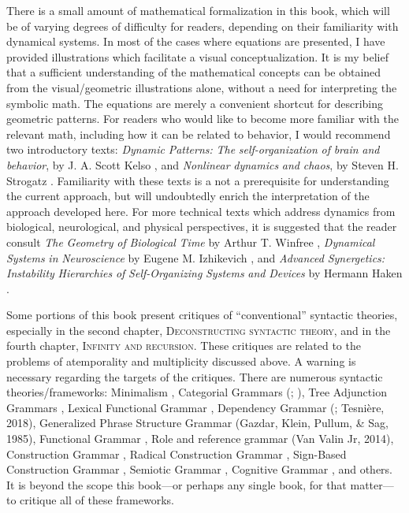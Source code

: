   There is a small amount of mathematical formalization in this book, which will be of varying degrees of difficulty for readers, depending on their familiarity with dynamical systems. In most of the cases where equations are presented, I have provided illustrations which facilitate a visual conceptualization. It is my belief that a sufficient understanding of the mathematical concepts can be obtained from the visual/geometric illustrations alone, without a need for interpreting the symbolic math. The equations are merely a convenient shortcut for describing geometric patterns. For readers who would like to become more familiar with the relevant math, including how it can be related to behavior, I would recommend two introductory texts: \textit{Dynamic} \textit{Patterns:} \textit{The} \textit{self-organization} \textit{of} \textit{brain} \textit{and} \textit{behavior}, by J. A. Scott Kelso \citep{Kelso1997}, and \textit{Nonlinear} \textit{dynamics} \textit{and} \textit{chaos}, by Steven H. Strogatz \citep{Strogatz2018}. Familiarity with these texts is a not a prerequisite for understanding the current approach, but will undoubtedly enrich the interpretation of the approach developed here. For more technical texts which address dynamics from biological, neurological, and physical perspectives, it is suggested that the reader consult \textit{The} \textit{Geometry} \textit{of} \textit{Biological} \textit{Time} by Arthur T. Winfree \citep{Winfree2001}, \textit{Dynamical} \textit{Systems} \textit{in} \textit{Neuroscience} by Eugene M. Izhikevich \citep{Izhikevich2007}, and \textit{Advanced} \textit{Synergetics:} \textit{Instability} \textit{Hierarchies} \textit{of} \textit{Self-Organizing} \textit{Systems} \textit{and} \textit{Devices} by Hermann Haken \citep{Haken1983a}.

  Some portions of this book present critiques of “conventional” syntactic theories, especially in the second chapter, \textsc{Deconstructing} \textsc{syntactic} \textsc{theory,} and in the fourth chapter, \textsc{Infinity} \textsc{and} \textsc{recursion}. These critiques are related to the problems of atemporality and multiplicity discussed above. A warning is necessary regarding the targets of the critiques. There are numerous syntactic theories/frameworks: Minimalism \citep{Chomsky1995}, Categorial Grammars (\citealt{Steedman1993}; \citealt{Wood2014}), Tree Adjunction Grammars \citep{Joshi1987}, Lexical Functional Grammar \citep{BresnanKaplan1982}, Dependency Grammar (\citealt{Hudson1977}; Tesnière, 2018), Generalized Phrase Structure Grammar (Gazdar, Klein, Pullum, \& Sag, 1985), Functional Grammar \citep{Dik1981}, Role and reference grammar (Van Valin Jr, 2014), Construction Grammar \citep{Goldberg1995}, Radical Construction Grammar \citep{Croft2001}, Sign-Based Construction Grammar \citep{Sag2012}, Semiotic Grammar \citep{Mcgregor1997}, Cognitive Grammar \citep{Langacker2008}, and others. It is beyond the scope this book—or perhaps any single book, for that matter—to critique all of these frameworks.

